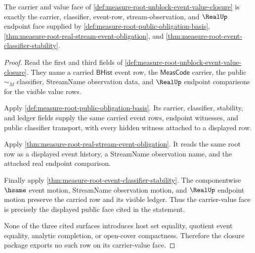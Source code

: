 \begin{theorem}
\label{thm:measure-root-unblock-carrier-event-value-closure}
The carrier and value face of
\autoref{def:measure-root-unblock-event-value-closure} is exactly the
carrier, classifier, event-row, stream-observation, and $\RealUp$ endpoint
face supplied by \autoref{def:measure-root-public-obligation-basis},
\autoref{thm:measure-root-real-stream-event-obligation}, and
\autoref{thm:measure-root-event-classifier-stability}.
\end{theorem}
\begin{proof}
Read the first and third fields of
\autoref{def:measure-root-unblock-event-value-closure}. They name a carried
$\mathsf{BHist}$ event row, the $\mathsf{MeasCode}$ carrier, the public
$\sim_M$ classifier, StreamName observation data, and $\RealUp$ endpoint
comparisons for the visible value rows.

Apply \autoref{def:measure-root-public-obligation-basis}. Its carrier,
classifier, stability, and ledger fields supply the same carried event rows,
endpoint witnesses, and public classifier transport, with every hidden
witness attached to a displayed row.

Apply \autoref{thm:measure-root-real-stream-event-obligation}. It reads the
same root row as a displayed event history, a StreamName observation name,
and the attached real endpoint comparison.

Finally apply \autoref{thm:measure-root-event-classifier-stability}. The
componentwise $\hsame$ event motion, StreamName observation motion, and
$\RealUp$ endpoint motion preserve the carried row and its visible ledger.
Thus the carrier-value face is precisely the displayed public face cited in
the statement.

None of the three cited surfaces introduces host set equality, quotient
event equality, analytic completion, or open-cover compactness. Therefore
the closure package exports no such row on its carrier-value face.
\end{proof}

